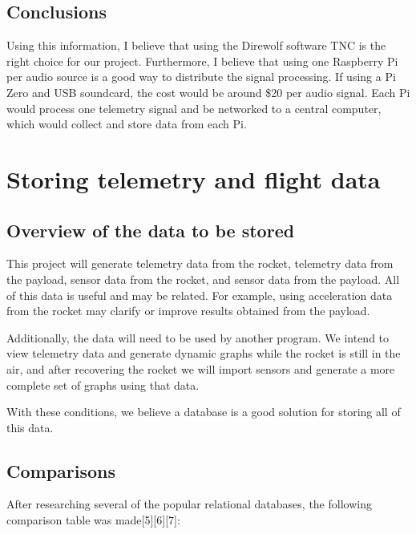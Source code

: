 \documentclass[onecolumn, draftclsnofoot, 10pt, compsoc]{IEEEtran}
\begin{document}
\subsection{Conclusions}
Using this information, I believe that using the Direwolf software TNC is the right choice for our project. Furthermore, I believe that using one Raspberry Pi per audio source is a good way to distribute the signal processing.  If using a Pi Zero and USB soundcard, the cost would be around \$20 per audio signal.  Each Pi would process one telemetry signal and be networked to a central computer, which would collect and store data from each Pi.

\section{Storing telemetry and flight data}

\subsection{Overview of the data to be stored}
This project will generate telemetry data from the rocket, telemetry data from the payload, sensor data from the rocket, and sensor data from the payload.  All of this data is useful and may be related.  For example, using acceleration data from the rocket may clarify or improve results obtained from the payload.

Additionally, the data will need to be used by another program.  We intend to view telemetry data and generate dynamic graphs while the rocket is still in the air, and after recovering the rocket we will import sensors and generate a more complete set of graphs using that data.

With these conditions, we believe a database is a good solution for storing all of this data.

\subsection{Comparisons}
After researching several of the popular relational databases, the following comparison table was made[5][6][7]:
\end{document}
